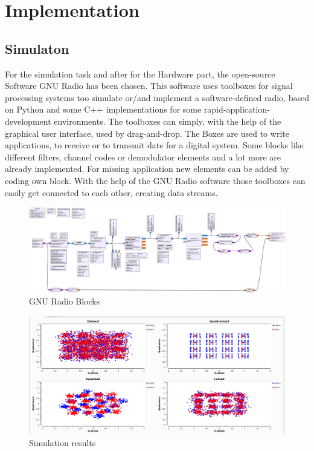 
\chapter{Implementation}

\section{Simulaton}

For the simulation task and after for the Hardware part, the open-source Software GNU Radio has been chosen. This software uses toolboxes for signal processing systems too simulate or/and implement a software-defined radio, based on Python and some C++ implementations for some rapid-application-development environments. The toolboxes can simply, with the help of the graphical user interface, used by drag-and-drop. The Boxes are used to write applications, to receive or to transmit date for a digital system. Some blocks like different filters, channel codes or demodulator elements and a lot more are already implemented. For missing application new elements can be added by coding own block. With the help of the GNU Radio software those toolboxes can easily get connected to each other, creating data streams. 

\begin{figure}
	\includegraphics[width=14cm]{./pdfs/qam_nogui.pdf}
	\caption{GNU Radio Blocks}
	\label{fig:simul16QAM_block}	
\end{figure}


\begin{figure}
	\includegraphics[width=14cm]{./figures/screenshots/QAM16_Fading_2.png}
	\caption{Simulation results}
	\label{fig:simul16QAM}	
\end{figure}

